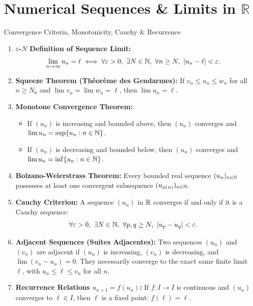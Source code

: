 \chapter{Numerical Sequences \& Limits in $\mathbb{R}$}
\label{chap:exo_ch04}

\begin{quicksummary}{Convergence Criteria, Monotonicity, Cauchy \& Recurrence}
\begin{enumerate}[leftmargin=1.4em,itemsep=3pt]
  \item \textbf{$\varepsilon$-$N$ Definition of Sequence Limit:}
  \[
  \lim_{n \to \infty} u_n = \ell \iff \forall \varepsilon > 0,\ \exists N \in \mathbb{N},\ \forall n \ge N,\ |u_n - \ell| < \varepsilon.
  \]
  \item \textbf{Squeeze Theorem (Théorème des Gendarmes):}
  If $v_n \le u_n \le w_n$ for all $n \ge N_0$ and $\lim v_n = \lim w_n = \ell$, then $\lim u_n = \ell$.
  \item \textbf{Monotone Convergence Theorem:}
  \begin{itemize}[leftmargin=1.2em,itemsep=1pt]
    \item If $(u_n)$ is increasing and bounded above, then $(u_n)$ converges and $\lim u_n = \sup \{u_n : n \in \mathbb{N}\}$.
    \item If $(u_n)$ is decreasing and bounded below, then $(u_n)$ converges and $\lim u_n = \inf \{u_n : n \in \mathbb{N}\}$.
  \end{itemize}
  \item \textbf{Bolzano-Weierstrass Theorem:}
  Every bounded real sequence $(u_n)_{n \in \mathbb{N}}$ possesses at least one convergent subsequence $(u_{\phi(n)})_{n \in \mathbb{N}}$.
  \item \textbf{Cauchy Criterion:}
  A sequence $(u_n)$ in $\mathbb{R}$ converges if and only if it is a Cauchy sequence:
  \[
  \forall \varepsilon > 0,\ \exists N \in \mathbb{N},\ \forall p, q \ge N,\ |u_p - u_q| < \varepsilon.
  \]
  \item \textbf{Adjacent Sequences (Suites Adjacentes):}
  Two sequences $(u_n)$ and $(v_n)$ are adjacent if $(u_n)$ is increasing, $(v_n)$ is decreasing, and $\lim (v_n - u_n) = 0$.
  They necessarily converge to the exact same finite limit $\ell$, with $u_n \le \ell \le v_n$ for all $n$.
  \item \textbf{Recurrence Relations $u_{n+1} = f(u_n)$:}
  If $f: I \to I$ is continuous and $(u_n)$ converges to $\ell \in I$, then $\ell$ is a fixed point: $f(\ell) = \ell$.
\end{enumerate}
\end{quicksummary}

